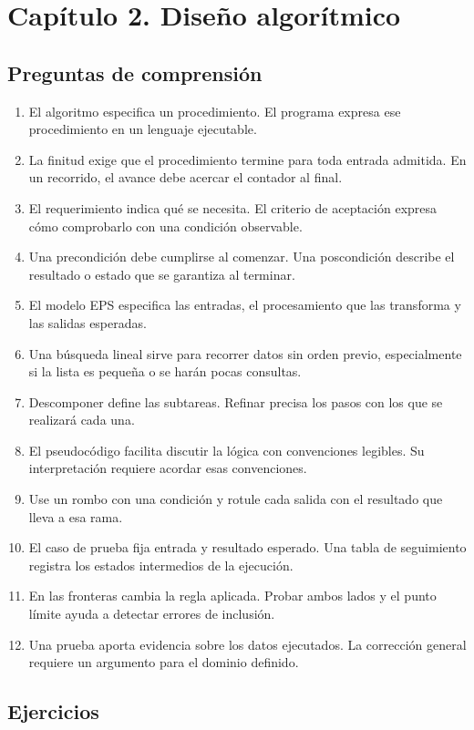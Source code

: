 \section{Capítulo 2. Diseño algorítmico}

\subsection{Preguntas de comprensión}

\begin{enumerate}
\item El algoritmo especifica un procedimiento. El programa expresa ese procedimiento en un lenguaje ejecutable.
\item La finitud exige que el procedimiento termine para toda entrada admitida. En un recorrido, el avance debe acercar el contador al final.
\item El requerimiento indica qué se necesita. El criterio de aceptación expresa cómo comprobarlo con una condición observable.
\item Una precondición debe cumplirse al comenzar. Una poscondición describe el resultado o estado que se garantiza al terminar.
\item El modelo EPS especifica las entradas, el procesamiento que las transforma y las salidas esperadas.
\item Una búsqueda lineal sirve para recorrer datos sin orden previo, especialmente si la lista es pequeña o se harán pocas consultas.
\item Descomponer define las subtareas. Refinar precisa los pasos con los que se realizará cada una.
\item El pseudocódigo facilita discutir la lógica con convenciones legibles. Su interpretación requiere acordar esas convenciones.
\item Use un rombo con una condición y rotule cada salida con el resultado que lleva a esa rama.
\item El caso de prueba fija entrada y resultado esperado. Una tabla de seguimiento registra los estados intermedios de la ejecución.
\item En las fronteras cambia la regla aplicada. Probar ambos lados y el punto límite ayuda a detectar errores de inclusión.
\item Una prueba aporta evidencia sobre los datos ejecutados. La corrección general requiere un argumento para el dominio definido.
\end{enumerate}

\subsection{Ejercicios}

